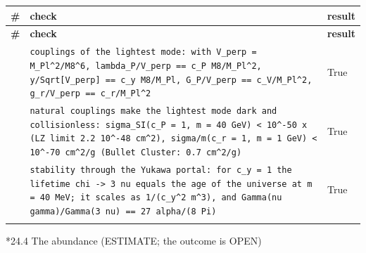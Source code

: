 \documentclass[10pt,a4paper]{article}
\makeatletter
\renewcommand\subsubsection{\@startsection{subsubsection}{3}{\z@}{-3.25ex\@plus -1ex \@minus -.2ex}{1.5ex \@plus .2ex}{\normalfont\normalsize\bfseries\raggedright}}
\makeatother
\begin{document}
{\footnotesize
\begin{longtable}{>{\raggedright\arraybackslash}p{}>{\raggedright\arraybackslash}p{}>{\raggedright\arraybackslash}p{}}
\toprule
\textbf{\#} & \textbf{check} & \textbf{result} \\
\midrule\endfirsthead
\toprule
\textbf{\#} & \textbf{check} & \textbf{result} \\
\midrule\endhead
\endfoot
\bottomrule\endlastfoot
406 & \texttt{couplings of the lightest mode: with V\_\allowbreak{}perp = M\_\allowbreak{}Pl\textasciicircum{}2/\allowbreak{}M8\textasciicircum{}6, lambda\_\allowbreak{}P/\allowbreak{}V\_\allowbreak{}perp == c\_\allowbreak{}P M8/\allowbreak{}M\_\allowbreak{}Pl\textasciicircum{}2, y/\allowbreak{}Sqrt[V\_\allowbreak{}perp] == c\_\allowbreak{}y M8/\allowbreak{}M\_\allowbreak{}Pl, G\_\allowbreak{}P/\allowbreak{}V\_\allowbreak{}perp == c\_\allowbreak{}V/\allowbreak{}M\_\allowbreak{}Pl\textasciicircum{}2, g\_\allowbreak{}r/\allowbreak{}V\_\allowbreak{}perp == c\_\allowbreak{}r/\allowbreak{}M\_\allowbreak{}Pl\textasciicircum{}2} & True \\
407 & \texttt{natural couplings make the lightest mode dark and collisionless: sigma\_\allowbreak{}SI(c\_\allowbreak{}P = 1, m = 40 GeV) < 10\textasciicircum{}-50 x (LZ limit 2.2 10\textasciicircum{}-48 cm\textasciicircum{}2), sigma/\allowbreak{}m(c\_\allowbreak{}r = 1, m = 1 GeV) < 10\textasciicircum{}-70 cm\textasciicircum{}2/\allowbreak{}g (Bullet Cluster: 0.7 cm\textasciicircum{}2/\allowbreak{}g)} & True \\
408 & \texttt{stability through the Yukawa portal: for c\_\allowbreak{}y = 1 the lifetime chi -> 3 nu equals the age of the universe at m = 40 MeV; it scales as 1/\allowbreak{}(c\_\allowbreak{}y\textasciicircum{}2 m\textasciicircum{}3), and Gamma(nu gamma)/\allowbreak{}Gamma(3 nu) == 27 alpha/\allowbreak{}(8 Pi)} & True \\*
\end{longtable}}
\subsubsection*{24.4 The abundance (ESTIMATE; the outcome is OPEN)}
\end{document}
